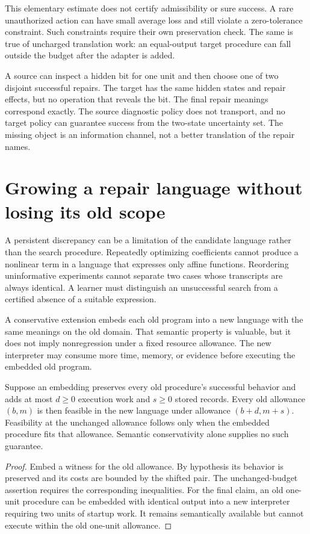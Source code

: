 This elementary estimate does not certify admissibility or sure success. A rare unauthorized action can have small average loss and still violate a zero-tolerance constraint. Such constraints require their own preservation check. The same is true of uncharged translation work: an equal-output target procedure can fall outside the budget after the adapter is added.

\begin{SIIcounterexample}\label{SII:ex:unavailable}
A source can inspect a hidden bit for one unit and then choose one of two disjoint successful repairs. The target has the same hidden states and repair effects, but no operation that reveals the bit. The final repair meanings correspond exactly. The source diagnostic policy does not transport, and no target policy can guarantee success from the two-state uncertainty set. The missing object is an information channel, not a better translation of the repair names.
\end{SIIcounterexample}

\section{Growing a repair language without losing its old scope}\label{SII:sec:grammar}
A persistent discrepancy can be a limitation of the candidate language rather than the search procedure. Repeatedly optimizing coefficients cannot produce a nonlinear term in a language that expresses only affine functions. Reordering uninformative experiments cannot separate two cases whose transcripts are always identical. A learner must distinguish an unsuccessful search from a certified absence of a suitable expression.

A conservative extension embeds each old program into a new language with the same meanings on the old domain. That semantic property is valuable, but it does not imply nonregression under a fixed resource allowance. The new interpreter may consume more time, memory, or evidence before executing the embedded old program.

\begin{SIIproposition}\label{SII:prop:extension}
Suppose an embedding preserves every old procedure's successful behavior and adds at most $d\geq0$ execution work and $s\geq0$ stored records. Every old allowance $(b,m)$ is then feasible in the new language under allowance $(b+d,m+s)$. Feasibility at the unchanged allowance follows only when the embedded procedure fits that allowance. Semantic conservativity alone supplies no such guarantee.
\end{SIIproposition}
\begin{proof}
Embed a witness for the old allowance. By hypothesis its behavior is preserved and its costs are bounded by the shifted pair. The unchanged-budget assertion requires the corresponding inequalities. For the final claim, an old one-unit procedure can be embedded with identical output into a new interpreter requiring two units of startup work. It remains semantically available but cannot execute within the old one-unit allowance.
\end{proof}

